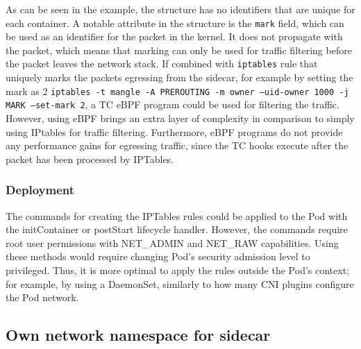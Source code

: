 \documentclass[english, 12pt, a4paper, sci, utf8, a-2b, online]{aaltothesis}
\begin{document}


As can be seen in the example, the structure has no identifiers that are unique for each container. A notable attribute in the structure is the \texttt{mark} field, which can be used as an identifier for the packet in the kernel. It does not propagate with the packet, which means that marking can only be used for traffic filtering before the packet leaves the network stack. If combined with \texttt{iptables} rule that uniquely marks the packets egressing from the sidecar, for example by setting the mark as 2 \texttt{iptables -t mangle -A PREROUTING -m owner --uid-owner 1000 -j MARK --set-mark 2}, a TC eBPF program could be used for filtering the traffic. However, using eBPF brings an extra layer of complexity in comparison to simply using IPtables for traffic filtering. Furthermore, eBPF programs do not provide any performance gains for egressing traffic, since the TC hooks execute after the packet has been processed by IPTables.

\subsubsection{Deployment}

The commands for creating the IPTables rules could be applied to the Pod with the initContainer or postStart lifecycle handler. However, the commands require root user permissions with NET\_ADMIN and NET\_RAW capabilities. Using these methods would require changing Pod's security admission level to privileged. Thus, it is more optimal to apply the rules outside the Pod's context; for example, by using a DaemonSet, similarly to how many CNI plugins configure the Pod network.

\subsection{Own network namespace for sidecar}



\end{document}
